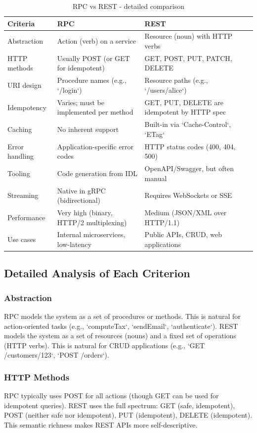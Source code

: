 \documentclass[a4paper]{article}
\begin{document}
\begin{table}[H]
\centering
\caption{RPC vs REST - detailed comparison}
\label{tab:rpc_rest}
\begin{tabular}{p{3.5cm}p{5cm}p{5cm}}
\toprule
\textbf{Criteria} & \textbf{RPC} & \textbf{REST} \\
\midrule
Abstraction & Action (verb) on a service & Resource (noun) with HTTP verbs \\
HTTP methods & Usually POST (or GET for idempotent) & GET, POST, PUT, PATCH, DELETE \\
URI design & Procedure names (e.g., `/login`) & Resource paths (e.g., `/users/alice`) \\
Idempotency & Varies; must be implemented per method & GET, PUT, DELETE are idempotent by HTTP spec \\
Caching & No inherent support & Built-in via `Cache-Control`, `ETag` \\
Error handling & Application-specific error codes & HTTP status codes (400, 404, 500) \\
Tooling & Code generation from IDL & OpenAPI/Swagger, but often manual \\
Streaming & Native in gRPC (bidirectional) & Requires WebSockets or SSE \\
Performance & Very high (binary, HTTP/2 multiplexing) & Medium (JSON/XML over HTTP/1.1) \\
Use cases & Internal microservices, low-latency & Public APIs, CRUD, web applications \\
\bottomrule
\end{tabular}
\end{table}

\subsection{Detailed Analysis of Each Criterion}

\subsubsection{Abstraction}
RPC models the system as a set of procedures or methods. This is natural for action-oriented tasks (e.g., `computeTax`, `sendEmail`, `authenticate`).  
REST models the system as a set of resources (nouns) and a fixed set of operations (HTTP verbs). This is natural for CRUD applications (e.g., `GET /customers/123`, `POST /orders`).

\subsubsection{HTTP Methods}
RPC typically uses POST for all actions (though GET can be used for idempotent queries). REST uses the full spectrum: GET (safe, idempotent), POST (neither safe nor idempotent), PUT (idempotent), DELETE (idempotent). This semantic richness makes REST APIs more self-descriptive.
\end{document}

